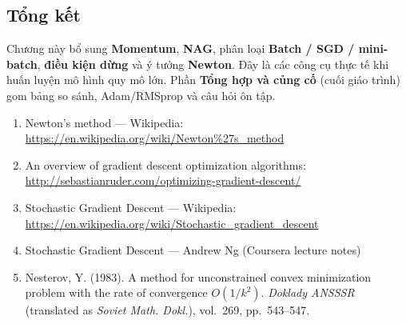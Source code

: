 \subsection{Tổng kết}
\label{subsec:gd-part2-conclusion}

\begin{tongket}[title={Tổng kết chương}]
Chương này bổ sung \textbf{Momentum}, \textbf{NAG}, phân loại \textbf{Batch / SGD / mini-batch}, \textbf{điều kiện dừng} và ý tưởng \textbf{Newton}. Đây là các công cụ thực tế khi huấn luyện mô hình quy mô lớn. Phần \textbf{Tổng hợp và củng cố} (cuối giáo trình) gom bảng so sánh, Adam/RMSprop và câu hỏi ôn tập.
\end{tongket}

\begin{phuongphap}[title={Tài liệu tham khảo}]
\begin{enumerate}
 \item Newton's method --- Wikipedia: \url{https://en.wikipedia.org/wiki/Newton%27s_method}
 \item An overview of gradient descent optimization algorithms: \url{http://sebastianruder.com/optimizing-gradient-descent/}
 \item Stochastic Gradient Descent --- Wikipedia: \url{https://en.wikipedia.org/wiki/Stochastic_gradient_descent}
 \item Stochastic Gradient Descent --- Andrew Ng (Coursera lecture notes)
 \item Nesterov, Y. (1983). A method for unconstrained convex minimization problem with the rate of convergence $O(1/k^2)$. \emph{Doklady ANSSSR} (translated as \emph{Soviet Math. Dokl.}), vol.~269, pp.~543--547.
\end{enumerate}
\end{phuongphap}
